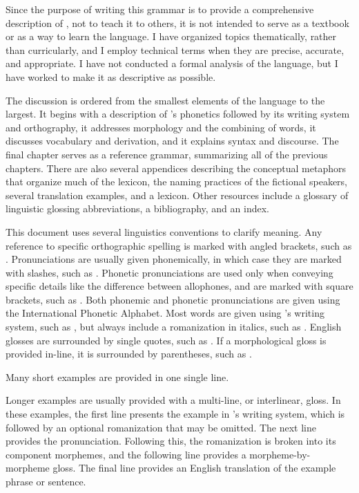 Since the purpose of writing this grammar is to provide a comprehensive description of \lang{}, not to teach it to others, it is not intended to serve as a textbook or as a way to learn the language. I have organized topics thematically, rather than curricularly, and I employ technical terms when they are precise, accurate, and appropriate. I have not conducted a formal analysis of the language, but I have worked to make it as descriptive as possible.

The discussion is ordered from the smallest elements of the language to the largest. It begins with a description of \lang{}'s phonetics followed by its writing system and orthography, it addresses morphology and the combining of words, it discusses vocabulary and derivation, and it explains syntax and discourse. The final chapter serves as a reference grammar, summarizing all of the previous chapters. There are also several appendices describing the conceptual metaphors that organize much of the lexicon, the naming practices of the fictional \lang{} speakers, several translation examples, and a lexicon. Other resources include a glossary of linguistic glossing abbreviations, a bibliography, and an index.

This document uses several linguistics conventions to clarify meaning. Any reference to specific orthographic spelling is marked with angled brackets, such as . Pronunciations are usually given phonemically, in which case they are marked with slashes, such as . Phonetic pronunciations are used only when conveying specific details like the difference between allophones, and are marked with square brackets, such as . Both phonemic and phonetic pronunciations are given using the International Phonetic Alphabet. Most \lang{} words are given using \lang{}'s writing system, such as , but always include a romanization in italics, such as . English glosses are surrounded by single quotes, such as . If a morphological gloss is provided in-line, it is surrounded by parentheses, such as \gloss{\Inf}.

Many short examples are provided in one single line.

	    
\xe

Longer examples are usually provided with a multi-line, or interlinear, gloss. In these examples, the first line presents the example in \lang{}'s writing system, which is followed by an optional romanization that may be omitted. The next line provides the pronunciation. Following this, the romanization is broken into its component morphemes, and the following line provides a morpheme-by-morpheme gloss. The final line provides an English translation of the example phrase or sentence.

